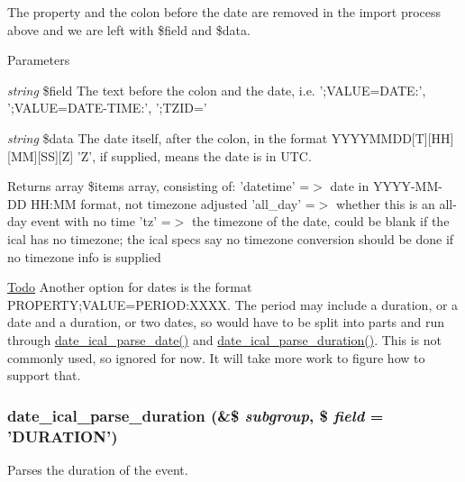 The property and the colon before the date are removed in the import process above and we are left with \$field and \$data.


\begin{DoxyParams}{Parameters}
\item[{\em string}]\$field The text before the colon and the date, i.e. ';VALUE=DATE:', ';VALUE=DATE-\/TIME:', ';TZID=' \item[{\em string}]\$data The date itself, after the colon, in the format YYYYMMDD\mbox{[}T\mbox{]}\mbox{[}HH\mbox{]}\mbox{[}MM\mbox{]}\mbox{[}SS\mbox{]}\mbox{[}Z\mbox{]} 'Z', if supplied, means the date is in UTC.\end{DoxyParams}
\begin{DoxyReturn}{Returns}
array \$items array, consisting of: 'datetime' =$>$ date in YYYY-\/MM-\/DD HH:MM format, not timezone adjusted 'all\_\-day' =$>$ whether this is an all-\/day event with no time 'tz' =$>$ the timezone of the date, could be blank if the ical has no timezone; the ical specs say no timezone conversion should be done if no timezone info is supplied 
\end{DoxyReturn}
\begin{Desc}
\item[\hyperlink{todo__todo000022}{Todo}]Another option for dates is the format PROPERTY;VALUE=PERIOD:XXXX. The period may include a duration, or a date and a duration, or two dates, so would have to be split into parts and run through \hyperlink{date__api__ical_8inc_a043a6a7b1c9724a27cd16750f01492c4}{date\_\-ical\_\-parse\_\-date()} and \hyperlink{date__api__ical_8inc_a8a63c8aa2158e701b01217637169440d}{date\_\-ical\_\-parse\_\-duration()}. This is not commonly used, so ignored for now. It will take more work to figure how to support that. \end{Desc}
\hypertarget{date__api__ical_8inc_a8a63c8aa2158e701b01217637169440d}{
\subsubsection[{date\_\-ical\_\-parse\_\-duration}]{\setlength{\rightskip}{0pt plus 5cm}date\_\-ical\_\-parse\_\-duration (\&\$ {\em subgroup}, \/  \$ {\em field} = {\ttfamily 'DURATION'})}}
\label{date__api__ical_8inc_a8a63c8aa2158e701b01217637169440d}
Parses the duration of the event.

